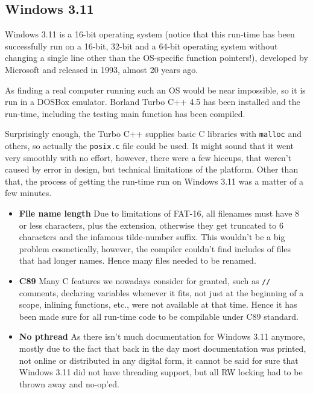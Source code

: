 \subsection{Windows 3.11}

Windows 3.11 is a 16-bit operating system (notice that this run-time has been successfully run on a 16-bit, 32-bit and a 64-bit operating system without changing a single line other than the OS-specific function pointers!), developed by Microsoft and released in 1993, almost 20 years ago.

As finding a real computer running such an OS would be near impossible, so it is run in a DOSBox emulator. Borland Turbo C++ 4.5 has been installed and the run-time, including the testing main function has been compiled.

Surprisingly enough, the Turbo C++ supplies basic C libraries with \verb=malloc= and others, so actually the \verb=posix.c= file could be used. It might sound that it went very smoothly with no effort, however, there were a few hiccups, that weren't caused by error in design, but technical limitations of the platform. Other than that, the process of getting the run-time run on Windows 3.11 was a matter of a few minutes.

\begin{itemize}
  \item{\bf{File name length}} Due to limitations of FAT-16, all filenames must have 8 or less characters, plus the extension, otherwise they get truncated to 6 characters and the infamous tilde-number suffix. This wouldn't be a big problem cosmetically, however, the compiler couldn't find includes of files that had longer names. Hence many files needed to be renamed.
  \item{\bf{C89}} Many C features we nowadays consider for granted, such as \verb=//= comments, declaring variables whenever it fits, not just at the beginning of a scope, inlining functions, etc., were not available at that time. Hence it has been made sure for all run-time code to be compilable under C89 standard.
  \item{\bf{No pthread}} As there isn't much documentation for Windows 3.11 anymore, mostly due to the fact that back in the day most documentation was printed, not online or distributed in any digital form, it cannot be said for sure that Windows 3.11 did not have threading support, but all RW locking had to be thrown away and no-op'ed. 
\end{itemize}

